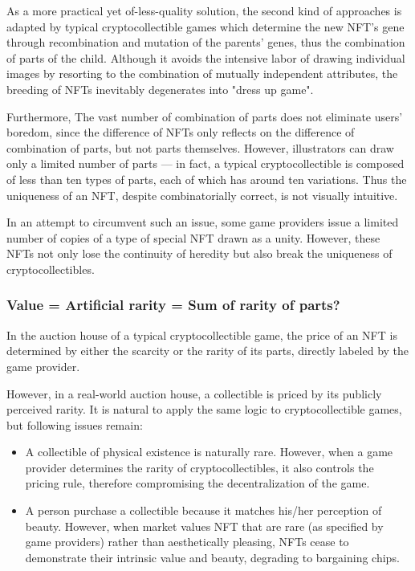 \documentclass[b5paper]{article}
\begin{document}
As a more practical yet of-less-quality solution, the second kind of approaches is adapted by typical cryptocollectible games\cite{cryptokitties,etherwaifu,cryptofighters} which determine the new NFT's gene through recombination and mutation of the parents' genes, thus the combination of parts of the child. Although it avoids the intensive labor of drawing individual images by resorting to the combination of mutually independent attributes, the breeding of NFTs inevitably degenerates into "dress up game".

Furthermore, The vast number of combination of parts does not eliminate users' boredom, since the difference of NFTs only reflects on the difference of combination of parts, but not parts themselves. However, illustrators can draw only a limited number of parts --- in fact, a typical cryptocollectible is composed of less than ten types of parts, each of which has around ten variations. Thus the uniqueness of an NFT, despite combinatorially correct, is not visually intuitive.

In an attempt to circumvent such an issue, some game providers issue a limited number of copies of a type of special NFT drawn as a unity. However, these NFTs not only lose the continuity of heredity but also break the uniqueness of cryptocollectibles.

\subsubsection{Value = Artificial rarity = Sum of rarity of parts?}

In the auction house of a typical cryptocollectible game, the price of an NFT is determined by either the scarcity or the rarity of its parts, directly labeled by the game provider.

However, in a real-world auction house, a collectible is priced by its publicly perceived rarity. It is natural to apply the same logic to cryptocollectible games, but following issues remain:

\begin{itemize}
\item A collectible of physical existence is naturally rare. However, when a game provider determines the rarity of cryptocollectibles, it also controls the pricing rule, therefore compromising the decentralization of the game.
\item A person purchase a collectible because it matches his/her perception of beauty. However, when market values NFT that are rare (as specified by game providers) rather than aesthetically pleasing, NFTs cease to demonstrate their intrinsic value and beauty, degrading to bargaining chips. 
\end{itemize}
\end{document}
